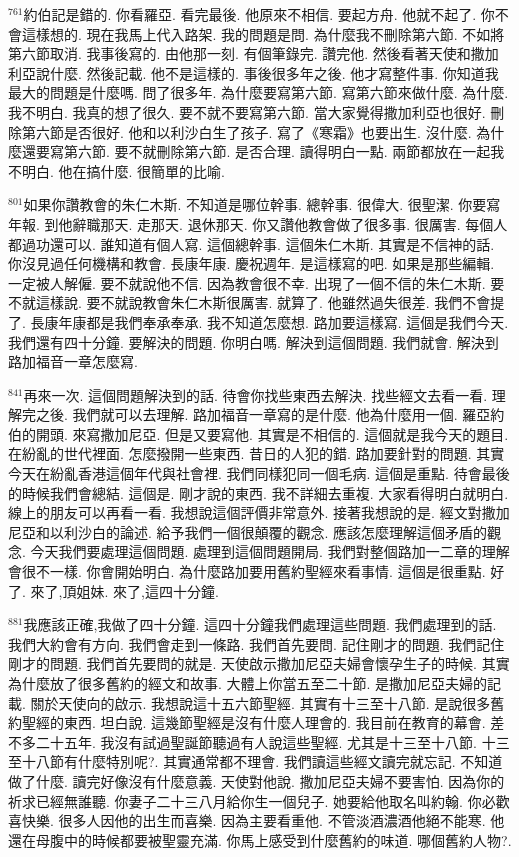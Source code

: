 \documentclass{book}
\begin{document}
$^{761}$約伯記是錯的.
你看羅亞.
看完最後.
他原來不相信.
要起方舟.
他就不起了.
你不會這樣想的.
現在我馬上代入路架.
我的問題是問.
為什麼我不刪除第六節.
不如將第六節取消.
我事後寫的.
由他那一刻.
有個筆錄完.
讚完他.
然後看著天使和撒加利亞說什麼.
然後記載.
他不是這樣的.
事後很多年之後.
他才寫整件事.
你知道我最大的問題是什麼嗎.
問了很多年.
為什麼要寫第六節.
寫第六節來做什麼.
為什麼.
我不明白.
我真的想了很久.
要不就不要寫第六節.
當大家覺得撒加利亞也很好.
刪除第六節是否很好.
他和以利沙白生了孩子.
寫了《寒霜》也要出生.
沒什麼.
為什麼還要寫第六節.
要不就刪除第六節.
是否合理.
讀得明白一點.
兩節都放在一起我不明白.
他在搞什麼.
很簡單的比喻.

$^{801}$如果你讚教會的朱仁木斯.
不知道是哪位幹事.
總幹事.
很偉大.
很聖潔.
你要寫年報.
到他辭職那天.
走那天.
退休那天.
你又讚他教會做了很多事.
很厲害.
每個人都過功還可以.
誰知道有個人寫.
這個總幹事.
這個朱仁木斯.
其實是不信神的話.
你沒見過任何機構和教會.
長康年康.
慶祝週年.
是這樣寫的吧.
如果是那些編輯.
一定被人解僱.
要不就說他不信.
因為教會很不幸.
出現了一個不信的朱仁木斯.
要不就這樣說.
要不就說教會朱仁木斯很厲害.
就算了.
他雖然過失很差.
我們不會提了.
長康年康都是我們奉承奉承.
我不知道怎麼想.
路加要這樣寫.
這個是我們今天.
我們還有四十分鐘.
要解決的問題.
你明白嗎.
解決到這個問題.
我們就會.
解決到路加福音一章怎麼寫.

$^{841}$再來一次.
這個問題解決到的話.
待會你找些東西去解決.
找些經文去看一看.
理解完之後.
我們就可以去理解.
路加福音一章寫的是什麼.
他為什麼用一個.
羅亞約伯的開頭.
來寫撒加尼亞.
但是又要寫他.
其實是不相信的.
這個就是我今天的題目.
在紛亂的世代裡面.
怎麼撥開一些東西.
昔日的人犯的錯.
路加要針對的問題.
其實今天在紛亂香港這個年代與社會裡.
我們同樣犯同一個毛病.
這個是重點.
待會最後的時候我們會總結.
這個是.
剛才說的東西.
我不詳細去重複.
大家看得明白就明白.
線上的朋友可以再看一看.
我想說這個評價非常意外.
接著我想說的是.
經文對撒加尼亞和以利沙白的論述.
給予我們一個很顛覆的觀念.
應該怎麼理解這個矛盾的觀念.
今天我們要處理這個問題.
處理到這個問題開局.
我們對整個路加一二章的理解會很不一樣.
你會開始明白.
為什麼路加要用舊約聖經來看事情.
這個是很重點.
好了.
來了,頂姐妹.
來了,這四十分鐘.

$^{881}$我應該正確,我做了四十分鐘.
這四十分鐘我們處理這些問題.
我們處理到的話.
我們大約會有方向.
我們會走到一條路.
我們首先要問.
記住剛才的問題.
我們記住剛才的問題.
我們首先要問的就是.
天使啟示撒加尼亞夫婦會懷孕生子的時候.
其實為什麼放了很多舊約的經文和故事.
大體上你當五至二十節.
是撒加尼亞夫婦的記載.
關於天使向的啟示.
我想說這十五六節聖經.
其實有十三至十八節.
是說很多舊約聖經的東西.
坦白說.
這幾節聖經是沒有什麼人理會的.
我目前在教育的幕會.
差不多二十五年.
我沒有試過聖誕節聽過有人說這些聖經.
尤其是十三至十八節.
十三至十八節有什麼特別呢?.
其實通常都不理會.
我們讀這些經文讀完就忘記.
不知道做了什麼.
讀完好像沒有什麼意義.
天使對他說.
撒加尼亞夫婦不要害怕.
因為你的祈求已經無誰聽.
你妻子二十三八月給你生一個兒子.
她要給他取名叫約翰.
你必歡喜快樂.
很多人因他的出生而喜樂.
因為主要看重他.
不管淡酒濃酒他絕不能寒.
他還在母腹中的時候都要被聖靈充滿.
你馬上感受到什麼舊約的味道.
哪個舊約人物?.
\end{document}
